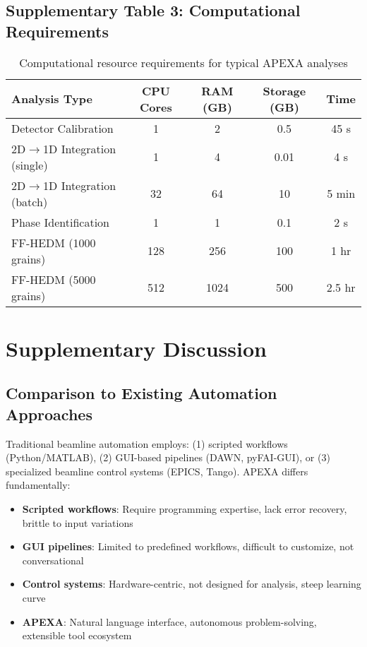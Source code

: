 \documentclass[11pt]{article}
\begin{document}
\subsection{Supplementary Table 3: Computational Requirements}

\begin{table}[H]
\centering
\caption{Computational resource requirements for typical APEXA analyses}
\begin{tabular}{lcccc}
\toprule
Analysis Type & CPU Cores & RAM (GB) & Storage (GB) & Time \\
\midrule
Detector Calibration & 1 & 2 & 0.5 & 45 s \\
2D$\rightarrow$1D Integration (single) & 1 & 4 & 0.01 & 4 s \\
2D$\rightarrow$1D Integration (batch) & 32 & 64 & 10 & 5 min \\
Phase Identification & 1 & 1 & 0.1 & 2 s \\
FF-HEDM (1000 grains) & 128 & 256 & 100 & 1 hr \\
FF-HEDM (5000 grains) & 512 & 1024 & 500 & 2.5 hr \\
\bottomrule
\end{tabular}
\end{table}

\section{Supplementary Discussion}

\subsection{Comparison to Existing Automation Approaches}

Traditional beamline automation employs: (1) scripted workflows (Python/MATLAB), (2) GUI-based pipelines (DAWN, pyFAI-GUI), or (3) specialized beamline control systems (EPICS, Tango). APEXA differs fundamentally:

\begin{itemize}
    \item \textbf{Scripted workflows}: Require programming expertise, lack error recovery, brittle to input variations
    \item \textbf{GUI pipelines}: Limited to predefined workflows, difficult to customize, not conversational
    \item \textbf{Control systems}: Hardware-centric, not designed for analysis, steep learning curve
    \item \textbf{APEXA}: Natural language interface, autonomous problem-solving, extensible tool ecosystem
\end{itemize}
\end{document}
